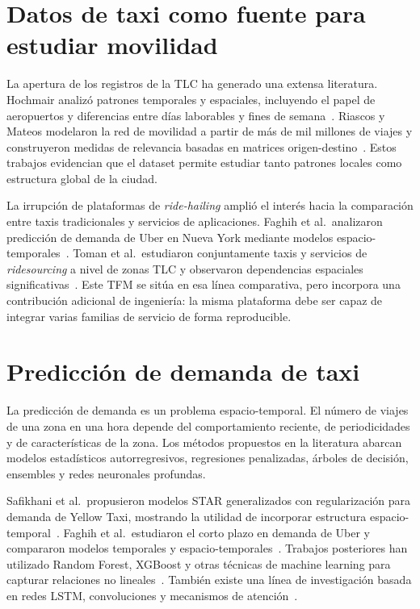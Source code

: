 \section{Datos de taxi como fuente para estudiar movilidad}

La apertura de los registros de la TLC ha generado una extensa literatura. Hochmair analizó patrones temporales y espaciales, incluyendo el papel de aeropuertos y diferencias entre días laborables y fines de semana~\cite{hochmair2016}. Riascos y Mateos modelaron la red de movilidad a partir de más de mil millones de viajes y construyeron medidas de relevancia basadas en matrices origen-destino~\cite{riascos2020}. Estos trabajos evidencian que el dataset permite estudiar tanto patrones locales como estructura global de la ciudad.

La irrupción de plataformas de \textit{ride-hailing} amplió el interés hacia la comparación entre taxis tradicionales y servicios de aplicaciones. Faghih et al.\ analizaron predicción de demanda de Uber en Nueva York mediante modelos espacio-temporales~\cite{faghih2019}. Toman et al.\ estudiaron conjuntamente taxis y servicios de \textit{ridesourcing} a nivel de zonas TLC y observaron dependencias espaciales significativas~\cite{toman2020}. Este TFM se sitúa en esa línea comparativa, pero incorpora una contribución adicional de ingeniería: la misma plataforma debe ser capaz de integrar varias familias de servicio de forma reproducible.

\section{Predicción de demanda de taxi}

La predicción de demanda es un problema espacio-temporal. El número de viajes de una zona en una hora depende del comportamiento reciente, de periodicidades y de características de la zona. Los métodos propuestos en la literatura abarcan modelos estadísticos autorregresivos, regresiones penalizadas, árboles de decisión, ensembles y redes neuronales profundas.

\begin{sloppypar}
Safikhani et al.\ propusieron modelos STAR generalizados con regularización para demanda de Yellow Taxi, mostrando la utilidad de incorporar estructura espacio-temporal~\cite{safikhani2020}. Faghih et al.\ estudiaron el corto plazo en demanda de Uber y compararon modelos temporales y espacio-temporales~\cite{faghih2019}. Trabajos posteriores han utilizado Random Forest, XGBoost y otras técnicas de machine learning para capturar relaciones no lineales~\cite{correa2023}. También existe una línea de investigación basada en redes LSTM, convoluciones y mecanismos de atención~\cite{mtldemand2020,berttaxi2022}.
\end{sloppypar}

